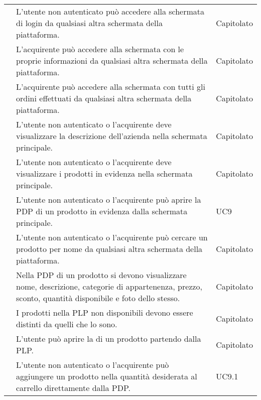 \begin{longtable}{|c C{9.5cm} C{2.5cm}|}
     & L'utente non autenticato può accedere alla schermata di login da qualsiasi altra schermata della piattaforma. & Capitolato \\

     & L'acquirente può accedere alla schermata con le proprie informazioni da qualsiasi altra schermata della piattaforma. & Capitolato \\

     & L'acquirente può accedere alla schermata con tutti gli ordini effettuati da qualsiasi altra schermata della piattaforma. & Capitolato \\


     & L'utente non autenticato o l'acquirente deve visualizzare la descrizione dell'azienda nella schermata principale. & Capitolato \\
    
     & L'utente non autenticato o l'acquirente deve visualizzare i prodotti in evidenza nella schermata principale. & Capitolato \\

     & L'utente non autenticato o l'acquirente può aprire la PDP di un prodotto in evidenza dalla schermata principale. & UC9 \\
    
     & L'utente non autenticato o l'acquirente può cercare un prodotto per nome da qualsiasi altra schermata della piattaforma. & Capitolato \\
    
     & Nella PDP di un prodotto si devono visualizzare nome, descrizione, categorie di appartenenza, prezzo, sconto, quantità disponibile e foto dello stesso. & Capitolato \\
    
     & I prodotti nella PLP non disponibili devono essere distinti da quelli che lo sono. & Capitolato \\
    
     & L'utente può aprire la  di un prodotto partendo dalla PLP. & Capitolato \\
    

     & L'utente non autenticato o l'acquirente può aggiungere un prodotto nella quantità desiderata al carrello direttamente dalla PDP. & UC9.1 \\
    

\end{longtable}

